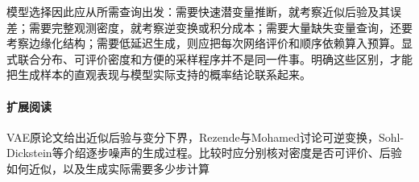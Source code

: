 模型选择因此应从所需查询出发：需要快速潜变量推断，就考察近似后验及其误差；需要完整观测密度，就考察逆变换或积分成本；需要大量缺失变量查询，还要考察边缘化结构；需要低延迟生成，则应把每次网络评价和顺序依赖算入预算。显式联合分布、可评价密度和方便的采样程序并不是同一件事。明确这些区别，才能把生成样本的直观表现与模型实际支持的概率结论联系起来。

\paragraph{扩展阅读}
VAE原论文给出近似后验与变分下界，Rezende与Mohamed讨论可逆变换，Sohl-Dickstein等介绍逐步噪声的生成过程。比较时应分别核对密度是否可评价、后验如何近似，以及生成实际需要多少步计算
